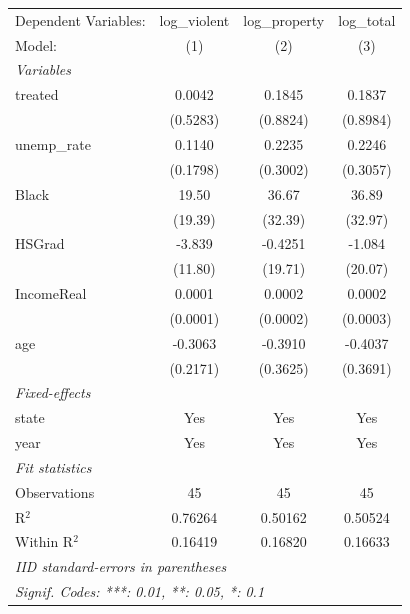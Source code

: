 
\begingroup
\centering
\begin{tabular}{lccc}
   \tabularnewline \midrule \midrule
   Dependent Variables: & log\_violent  & log\_property  & log\_total\\   
   Model:               & (1)           & (2)            & (3)\\  
   \midrule
   \emph{Variables}\\
   treated              & 0.0042        & 0.1845         & 0.1837\\   
                        & (0.5283)      & (0.8824)       & (0.8984)\\   
   unemp\_rate          & 0.1140        & 0.2235         & 0.2246\\   
                        & (0.1798)      & (0.3002)       & (0.3057)\\   
   Black                & 19.50         & 36.67          & 36.89\\   
                        & (19.39)       & (32.39)        & (32.97)\\   
   HSGrad               & -3.839        & -0.4251        & -1.084\\   
                        & (11.80)       & (19.71)        & (20.07)\\   
   IncomeReal           & 0.0001        & 0.0002         & 0.0002\\   
                        & (0.0001)      & (0.0002)       & (0.0003)\\   
   age                  & -0.3063       & -0.3910        & -0.4037\\   
                        & (0.2171)      & (0.3625)       & (0.3691)\\   
   \midrule
   \emph{Fixed-effects}\\
   state                & Yes           & Yes            & Yes\\  
   year                 & Yes           & Yes            & Yes\\  
   \midrule
   \emph{Fit statistics}\\
   Observations         & 45            & 45             & 45\\  
   R$^2$                & 0.76264       & 0.50162        & 0.50524\\  
   Within R$^2$         & 0.16419       & 0.16820        & 0.16633\\  
   \midrule \midrule
   \multicolumn{4}{l}{\emph{IID standard-errors in parentheses}}\\
   \multicolumn{4}{l}{\emph{Signif. Codes: ***: 0.01, **: 0.05, *: 0.1}}\\
\end{tabular}
\par\endgroup



